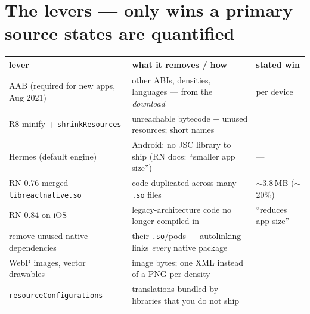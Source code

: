 \documentclass[8pt]{extarticle}
\begin{document}
\section{The levers — only wins a primary source states are quantified}
\renewcommand\arraystretch{1.05}
\noindent\begin{tabular}{@{}>{\raggedright\arraybackslash}p{50mm}>{\raggedright\arraybackslash}p{80mm}>{\raggedright\arraybackslash}p{32mm}@{}}
\toprule
\textbf{lever} & \textbf{what it removes / how} & \textbf{stated win} \\
\midrule
AAB (required for new apps, Aug 2021) & other ABIs, densities, languages — from the \emph{download} & per device \\
R8 minify + \texttt{shrinkResources} & unreachable bytecode + unused resources; short names & — \\
Hermes (default engine) & Android: no JSC library to ship (RN docs: ``smaller app size'') & — \\
RN 0.76 merged \texttt{libreactnative.so} & code duplicated across many \texttt{.so} files & $\sim$3.8\,MB ($\sim$20\%) \\
RN 0.84 on iOS & legacy-architecture code no longer compiled in & ``reduces app size'' \\
remove unused native dependencies & their \texttt{.so}/pods — autolinking links \emph{every} native package & — \\
WebP images, vector drawables & image bytes; one XML instead of a PNG per density & — \\
\texttt{resourceConfigurations} & translations bundled by libraries that you do not ship & — \\
\bottomrule
\end{tabular}
\end{document}
